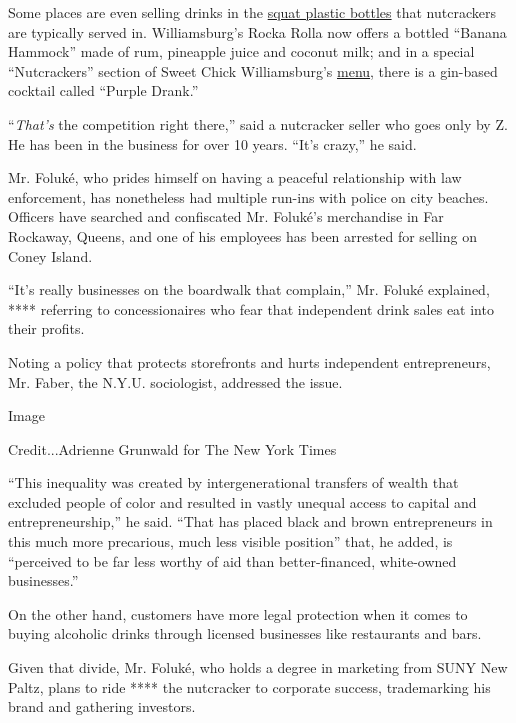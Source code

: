 Some places are even selling drinks in the
\href{https://www.instagram.com/p/CAlBg8BjV4R/}{squat plastic bottles}
that nutcrackers are typically served in. Williamsburg's Rocka Rolla now
offers a bottled ``Banana Hammock'' made of rum, pineapple juice and
coconut milk; and in a special ``Nutcrackers'' section of Sweet Chick
Williamsburg's
\href{https://www.grubhub.com/restaurant/sweet-chick-williamsburg-164-bedford-ave-brooklyn/1686005?classicAffiliateId=\%2Fr\%2Fw\%2F1686005\%2F\&utm_source=kitchen.grubhub.com\&utm_medium=OOL\&utm_campaign=order\%20online\&utm_content=1686005}{menu},
there is a gin-based cocktail called ``Purple Drank.''

``\emph{That's} the competition right there,'' said a nutcracker seller
who goes only by Z. He has been in the business for over 10 years.
``It's crazy,'' he said.

Mr. Foluké, who prides himself on having a peaceful relationship with
law enforcement, has nonetheless had multiple run-ins with police on
city beaches. Officers have searched and confiscated Mr. Foluké's
merchandise in Far Rockaway, Queens, and one of his employees has been
arrested for selling on Coney Island.

``It's really businesses on the boardwalk that complain,'' Mr. Foluké
explained, **** referring to concessionaires who fear that independent
drink sales eat into their profits.

Noting a policy that protects storefronts and hurts independent
entrepreneurs, Mr. Faber, the N.Y.U. sociologist, addressed the issue.

Image

Credit...Adrienne Grunwald for The New York Times

``This inequality was created by intergenerational transfers of wealth
that excluded people of color and resulted in vastly unequal access to
capital and entrepreneurship,'' he said. ``That has placed black and
brown entrepreneurs in this much more precarious, much less visible
position'' that, he added, is ``perceived to be far less worthy of aid
than better-financed, white-owned businesses.''

On the other hand, customers have more legal protection when it comes to
buying alcoholic drinks through licensed businesses like restaurants and
bars.

Given that divide, Mr. Foluké, who holds a degree in marketing from SUNY
New Paltz, plans to ride **** the nutcracker to corporate success,
trademarking his brand and gathering investors.

